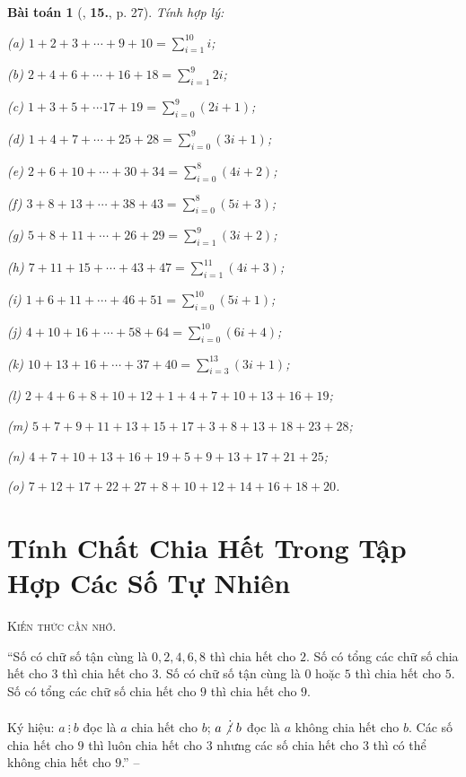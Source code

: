 \documentclass{article}
\numberwithin{equation}{section}
\newtheorem{baitoan}{Bài toán}[section]
\begin{document}
\begin{baitoan}[\cite{Trong_Toan_6_2021}, \textbf{15.}, p. 27]
	Tính hợp lý:
	\begin{enumerate*}
		\item[(a)] $1 + 2 + 3 + \cdots + 9 + 10 = \sum_{i=1}^{10} i$;
		\item[(b)] $2 + 4 + 6 + \cdots + 16 + 18 = \sum_{i=1}^9 2i$;
		\item[(c)] $1 + 3 + 5 + \cdots 17 + 19 = \sum_{i=0}^9 (2i + 1)$;
		\item[(d)] $1 + 4 + 7 + \cdots + 25 + 28 = \sum_{i=0}^9 (3i + 1)$;
		\item[(e)] $2 + 6 + 10 + \cdots + 30 + 34 = \sum_{i=0}^8 (4i + 2)$;
		\item[(f)] $3 + 8 + 13 + \cdots + 38 + 43 = \sum_{i=0}^8 (5i + 3)$;
		\item[(g)] $5 + 8 + 11 + \cdots + 26 + 29 = \sum_{i=1}^9 (3i + 2)$;
		\item[(h)] $7 + 11 + 15 + \cdots + 43 + 47 = \sum_{i=1}^{11} (4i + 3)$;
		\item[(i)] $1 + 6 + 11 + \cdots + 46 + 51 = \sum_{i=0}^{10} (5i + 1)$;
		\item[(j)] $4 + 10 + 16 + \cdots + 58 + 64 = \sum_{i=0}^{10} (6i + 4)$;
		\item[(k)] $10 + 13 + 16 + \cdots + 37 + 40 = \sum_{i=3}^{13} (3i + 1)$;
		\item[(l)] $2 + 4 + 6 + 8 + 10 + 12 + 1 + 4 + 7 + 10 + 13 + 16 + 19$;
		\item[(m)] $5 + 7 + 9 + 11 + 13 + 15 + 17 + 3 + 8 + 13 + 18 + 23 + 28$;
		\item[(n)] $4 + 7 + 10 + 13 + 16 + 19 + 5 + 9 + 13 + 17 + 21 + 25$;
		\item[(o)] $7 + 12 + 17 + 22 + 27 + 8 + 10 + 12 + 14 + 16 + 18 + 20$.
	\end{enumerate*}
\end{baitoan}


\section{Tính Chất Chia Hết Trong Tập Hợp Các Số Tự Nhiên}
\textsc{Kiến thức cần nhớ.}
\begin{tcolorbox}
	``Số có chữ số tận cùng là $0,2,4,6,8$ thì chia hết cho $2$. Số có tổng các chữ số chia hết cho $3$ thì chia hết cho $3$. Số có chữ số tận cùng là $0$ hoặc $5$ thì chia hết cho $5$. Số có tổng các chữ số chia hết cho $9$ thì chia hết cho $9$.
	
	Ký hiệu: $a\ \vdots\ b$ đọc là $a$ chia hết cho $b$; $a\not\vdots\ b$ đọc là $a$ không chia hết cho $b$. Các số chia hết cho $9$ thì luôn chia hết cho $3$ nhưng các số chia hết cho $3$ thì có thể không chia hết cho $9$.'' -- \cite[p. 30]{Trong_Toan_6_2021}
\end{tcolorbox}
\end{document}
